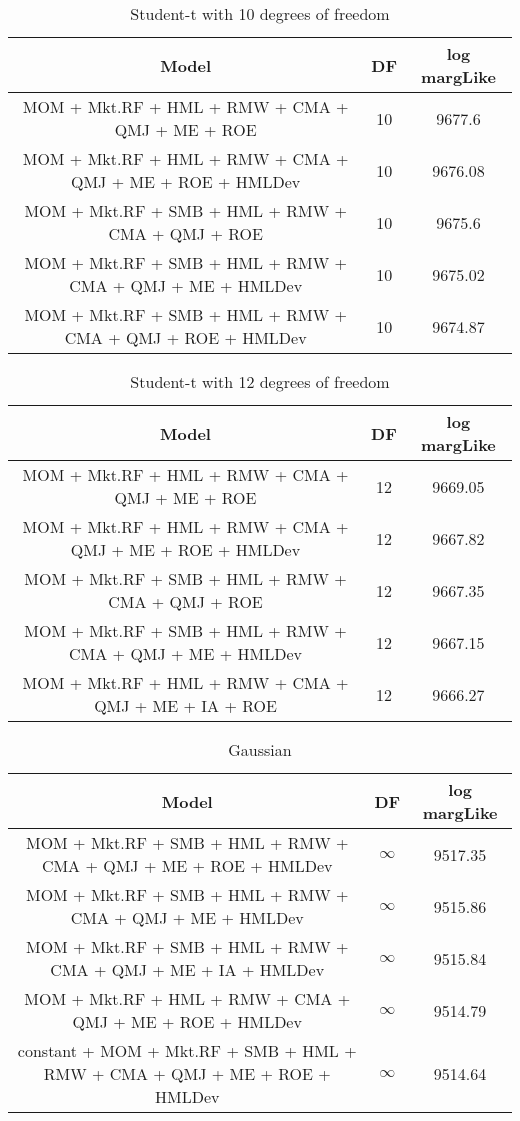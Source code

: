 \documentclass[12pt]{article}
\begin{document}
\begin{table}[ht]
	\centering
	\begin{tabular}{ccc}
		\hline
		Model & DF & log margLike \\ 
		\hline
		MOM + Mkt.RF + HML + RMW + CMA + QMJ + ME + ROE & 10 & 9677.6 \\ 
		MOM + Mkt.RF + HML + RMW + CMA + QMJ + ME + ROE + HMLDev & 10 & 9676.08 \\ 
		MOM + Mkt.RF + SMB + HML + RMW + CMA + QMJ + ROE & 10 & 9675.6 \\ 
		MOM + Mkt.RF + SMB + HML + RMW + CMA + QMJ + ME + HMLDev & 10 & 9675.02 \\ 
		MOM + Mkt.RF + SMB + HML + RMW + CMA + QMJ + ROE + HMLDev & 10 & 9674.87 \\ 
		\hline
	\end{tabular}
	\caption{Student-t with 10 degrees of freedom}
\end{table}
\begin{table}[ht]
	\centering
	\begin{tabular}{ccc}
		\hline
		Model & DF & log margLike \\ 
		\hline
		MOM + Mkt.RF + HML + RMW + CMA + QMJ + ME + ROE & 12 & 9669.05 \\ 
		MOM + Mkt.RF + HML + RMW + CMA + QMJ + ME + ROE + HMLDev & 12 & 9667.82 \\ 
		MOM + Mkt.RF + SMB + HML + RMW + CMA + QMJ + ROE & 12 & 9667.35 \\ 
		MOM + Mkt.RF + SMB + HML + RMW + CMA + QMJ + ME + HMLDev & 12 & 9667.15 \\ 
		MOM + Mkt.RF + HML + RMW + CMA + QMJ + ME + IA + ROE & 12 & 9666.27 \\ 
		\hline
	\end{tabular}
	\caption{Student-t with 12 degrees of freedom}
\end{table}

\begin{table}[ht]
	\footnotesize
	\centering
	\begin{tabular}{ccc}
		\hline
		Model & DF & log margLike \\ 
		\hline
		MOM + Mkt.RF + SMB + HML + RMW + CMA + QMJ + ME + ROE + HMLDev & $\infty$ & 9517.35 \\ 
		MOM + Mkt.RF + SMB + HML + RMW + CMA + QMJ + ME + HMLDev & $\infty$ & 9515.86 \\ 
		MOM + Mkt.RF + SMB + HML + RMW + CMA + QMJ + ME + IA + HMLDev & $\infty$ & 9515.84 \\ 
		MOM + Mkt.RF + HML + RMW + CMA + QMJ + ME + ROE + HMLDev & $\infty$ & 9514.79 \\ 
		constant + MOM + Mkt.RF + SMB + HML + RMW + CMA + QMJ + ME + ROE + HMLDev & $\infty$ & 9514.64 \\ 
		\hline
	\end{tabular}
	\caption{Gaussian}
\end{table}
\end{document}
